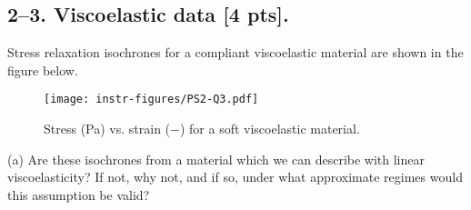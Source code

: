 





\bigskip
\subsection*{2--3. \textbf{Viscoelastic data} [4 pts].} 
Stress relaxation isochrones for a compliant viscoelastic material are shown in the figure below.  

\begin{figure}[H]
\vspace{-1em}
\centering
\texttt{[image: instr-figures/PS2-Q3.pdf]}
\caption{\small{Stress (Pa) vs. strain ($-$) for a soft viscoelastic material.}}
\end{figure}

\vspace{-1em}
(a) Are these isochrones from a material which we can describe with linear viscoelasticity? If not, why not, and if so, under what approximate regimes would this assumption be valid? 

